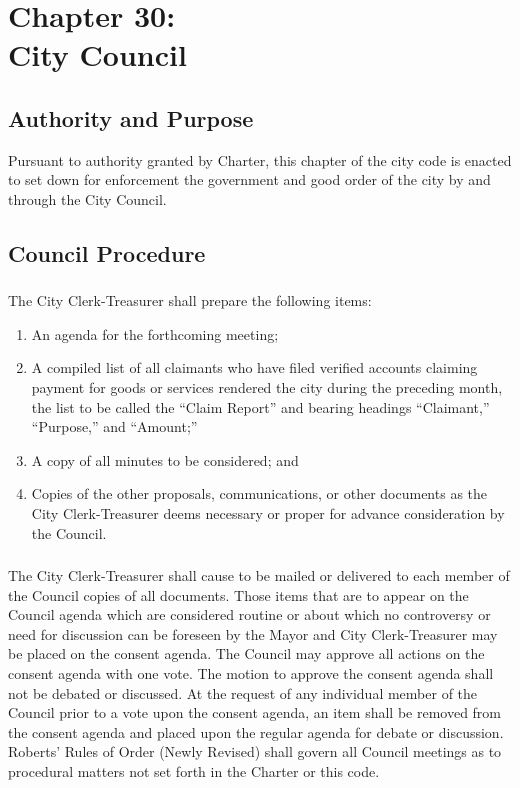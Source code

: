 \chapter*{Chapter 30: \\
	City Council}
    \vfill
    \minitoc
    \pagebreak

\section{Authority and Purpose}
Pursuant to authority granted by Charter, this chapter of the city code is enacted to set down for enforcement the government and good order of the city by and through the City Council.

\section{Council Procedure}
\subsection{}
The City Clerk-Treasurer shall prepare the following items:
\begin{enumerate}[{\indent}1)]
    \item An agenda for the forthcoming meeting;
    \item A compiled list of all claimants who have filed verified accounts claiming payment for goods or services rendered the city during the preceding month, the list to be called the “Claim Report” and bearing headings “Claimant,” “Purpose,” and “Amount;”
    \item A copy of all minutes to be considered; and
    \item Copies of the other proposals, communications, or other documents as the City Clerk-Treasurer deems necessary or proper for advance consideration by the Council.
\end{enumerate}
\subsection{}
The City Clerk-Treasurer shall cause to be mailed or delivered to each member of the Council copies of all documents.  Those items that are to appear on the Council agenda which are considered routine or about which no controversy or need for discussion can be foreseen by the Mayor and City Clerk-Treasurer may be placed on the consent agenda.  The Council may approve all actions on the consent agenda with one vote.  The motion to approve the consent agenda shall not be debated or discussed.  At the request of any individual member of the Council prior to a vote upon the consent agenda, an item shall be removed from the consent agenda and placed upon the regular agenda for debate or discussion.  Roberts’ Rules of Order (Newly Revised) shall govern all Council meetings as to procedural matters not set forth in the Charter or this code.

